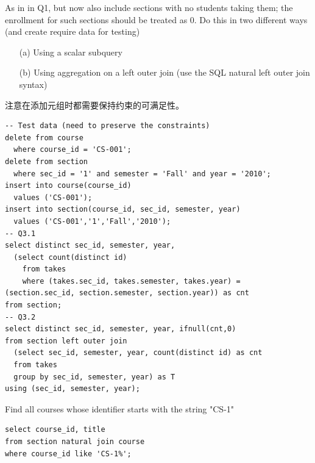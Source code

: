 \documentclass[logo,reportComp]{thesis}
\begin{document}
\begin{question}
\normalfont 
As in in Q1, but now also include sections with no students taking them; the enrollment for such sections should be treated as 0. Do this in two different ways (and create require data for testing)
\begin{itemize}
\item [(a)] Using a scalar subquery
\item [(b)] Using aggregation on a left outer join (use the SQL natural left outer join syntax)
\end{itemize}
\end{question}
\begin{answer}注意在添加元组时都需要保持约束的可满足性。
\begin{lstlisting}
-- Test data (need to preserve the constraints)
delete from course
  where course_id = 'CS-001';
delete from section
  where sec_id = '1' and semester = 'Fall' and year = '2010';
insert into course(course_id)
  values ('CS-001');
insert into section(course_id, sec_id, semester, year)
  values ('CS-001','1','Fall','2010');
-- Q3.1
select distinct sec_id, semester, year,
  (select count(distinct id)
    from takes
    where (takes.sec_id, takes.semester, takes.year) = (section.sec_id, section.semester, section.year)) as cnt
from section;
-- Q3.2
select distinct sec_id, semester, year, ifnull(cnt,0)
from section left outer join
  (select sec_id, semester, year, count(distinct id) as cnt
  from takes
  group by sec_id, semester, year) as T
using (sec_id, semester, year);
\end{lstlisting}
\end{answer}

\begin{question}
\normalfont 
Find all courses whose identifier starts with the string "CS-1"
\end{question}
\begin{answer}\mbox{}\par
\begin{lstlisting}
select course_id, title
from section natural join course
where course_id like 'CS-1%';
\end{lstlisting}
\end{answer}
\end{document}
